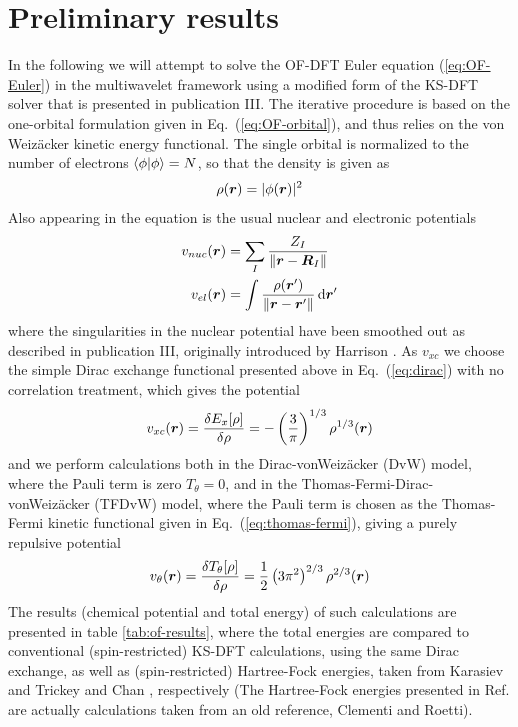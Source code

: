 \section{Preliminary results}
In the following we will attempt to solve the OF-DFT Euler equation (\ref{eq:OF-Euler}) in the multiwavelet 
framework using a modified form of the KS-DFT solver that is presented in publication III. The iterative
procedure is based on the one-orbital formulation given in Eq.~(\ref{eq:OF-orbital}), and thus relies on the
von Weiz\"{a}cker kinetic energy functional. The single orbital is normalized to the number of electrons 
$\langle\phi|\phi\rangle = N$, so that the density is given as
\begin{equation}
    \rho(\boldsymbol r) = |\phi(\boldsymbol r)|^2
\end{equation}
Also appearing in the equation is the usual nuclear and electronic potentials
\begin{align}
    v_{nuc}(\boldsymbol r) &= \sum_{I} \frac{Z_I}{\|\boldsymbol r-\boldsymbol R_I\|} \\
    v_{el}(\boldsymbol r) &= \int \frac{\rho(\boldsymbol r')}{\|\boldsymbol r-\boldsymbol r'\|} \,\mathrm{d}\boldsymbol r'
\end{align}
where the singularities in the nuclear potential have been smoothed out as described in publication III, 
originally introduced by Harrison \etal\cite{Harrison_basic:2004}. As $v_{xc}$ we choose the simple Dirac exchange
functional presented above in Eq.~(\ref{eq:dirac}) with no correlation treatment, which gives the potential
\begin{equation}
    v_{xc}(\boldsymbol r) = \frac{\delta E_x[\rho]}{\delta \rho} = -\left(\frac{3}{\pi}\right)^{1/3} \rho^{1/3}(\boldsymbol r)
\end{equation}
and we perform calculations both in the Dirac-vonWeiz\"{a}cker (DvW) model, where the Pauli term is zero 
$T_\theta = 0$, and in the Thomas-Fermi-Dirac-vonWeiz\"{a}cker (TFDvW) model, where the Pauli term is chosen as
the Thomas-Fermi kinetic functional given in Eq.~(\ref{eq:thomas-fermi}), giving a purely repulsive potential
\begin{equation}
    v_\theta(\boldsymbol r) = \frac{\delta T_\theta[\rho]}{\delta\rho} = \frac{1}{2}\left(3\pi^2\right)^{2/3} \rho^{2/3}(\boldsymbol r)
\end{equation}
The results (chemical potential and total energy) of such calculations are presented in table \ref{tab:of-results}, where
the total energies are compared to conventional (spin-restricted) KS-DFT calculations, using the same Dirac exchange,
as well as (spin-restricted) Hartree-Fock energies, taken from Karasiev and Trickey\cite{Karasiev:2012} and Chan 
\etal\cite{Chan:2000}, respectively (The Hartree-Fock energies presented in Ref.\cite{Chan:2000} are actually calculations 
taken from an old reference, Clementi and Roetti\cite{Clementi:1974}).

